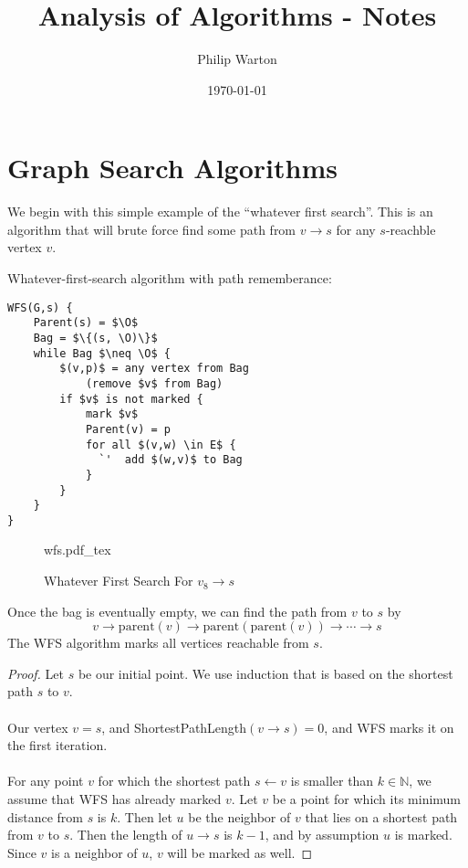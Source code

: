 \documentclass{article}
\newcommand{\incfig}[1]{%
    \def\svgwidth{\columnwidth}
    {#1.pdf_tex}
}
\theoremstyle{definition}
\begin{document}
\title{Analysis of Algorithms - Notes}
\author{Philip Warton}
\date{\today}
\maketitle
\section{Graph Search Algorithms}
We begin with this simple example of the ``whatever first search''. This is an algorithm that will brute force find some
path from $v \rightarrow s$ for any $s$-reachble vertex $v$.
\begin{mdframed}
    Whatever-first-search algorithm with path rememberance:
    \begin{lstlisting}[mathescape=true]
WFS(G,s) {
    Parent(s) = $\O$
    Bag = $\{(s, \O)\}$
    while Bag $\neq \O$ {
        $(v,p)$ = any vertex from Bag
            (remove $v$ from Bag)
        if $v$ is not marked {
            mark $v$
            Parent(v) = p
            for all $(v,w) \in E$ {
              `'  add $(w,v)$ to Bag
            }
        }
    }
}
    \end{lstlisting}
\end{mdframed}
\begin{figure}[ht]
    \centering
    \incfig{wfs}
    \caption{Whatever First Search For $v_8 \rightarrow s$}
    \label{fig:wfs}
\end{figure}
Once the bag is eventually empty, we can find the path from 
$v$ to $s$ by
\[
    v \rightarrow \text{parent}(v) \rightarrow \text{parent}(\text{parent}(v)) \rightarrow \cdots \rightarrow s
\]
The WFS algorithm marks all vertices reachable from $s$.
\begin{proof}
    Let $s$ be our initial point. We use induction that is based on the shortest path $s$ to $v$. \\\\
     Our vertex $v = s$, and ShortestPathLength$(v\rightarrow s) = 0$, and WFS marks it on the first iteration.\\\\
     For any point $v$ for which the shortest path $s \leftarrow v$ is smaller than $k \in \mathbb{N}$,
    we assume that WFS has already marked $v$. Let $v$ be a point for which its minimum distance from $s$ is $k$.
    Then let $u$ be the neighbor of $v$ that lies on 
    a shortest path from $v$ to $s$. Then the length of $u \rightarrow s$ is $k-1$, and by assumption $u$ is marked.
    Since $v$ is a neighbor of $u$, $v$ will be marked as well.
\end{proof}
\end{document}
